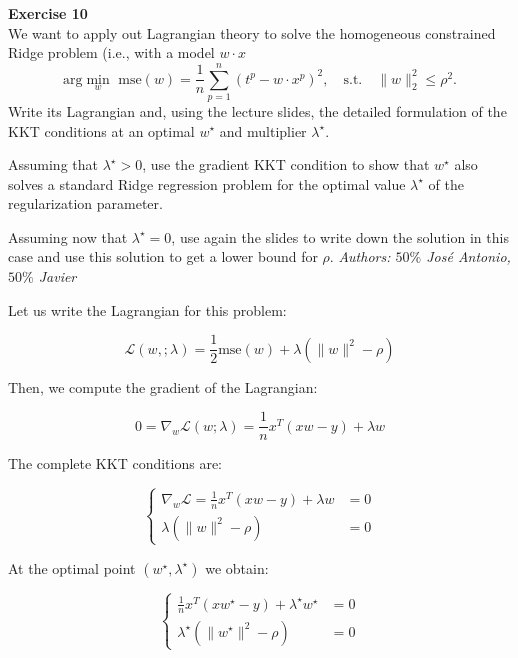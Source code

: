 \documentclass[11pt,table]{article}
\newenvironment{problem}[2][Exercise]
{ \begin{mdframed}[backgroundcolor=gray!20] \textbf{#1 #2} \\}
	{\hspace{0.0cm}\newline\newline \emph{Authors: \(50\%\) José Antonio, \(50\%\) Javier}  \end{mdframed}}
\newcommand\norm[1]{\lVert#1\rVert}
\begin{document}
	
	
	\begin{problem}{10}
		We want to apply out Lagrangian theory to solve the homogeneous constrained Ridge problem (i.e., with a model \(w\cdot x\)
		\[
		\text{arg}\min_{w} \text{ mse}(w) = \frac{1}{n} \sum_{p=1}^n (t^p - w \cdot x^p)^2, \quad \text{s.t.} \quad \norm{w}_2^2 \leq \rho^2.
		\]
		Write its Lagrangian and, using the lecture slides, the detailed formulation of the KKT conditions at an optimal \(w^\star\) and multiplier \(\lambda^\star\).
		
		Assuming that \(\lambda^\star > 0\), use the gradient KKT condition to show that \(w^\star\) also solves a standard Ridge regression problem for the optimal value \(\lambda^\star\) of the regularization parameter.
		
		Assuming now that \(\lambda^\star = 0\), use again the slides to write down the solution in this case and use this solution to get a lower bound for \(\rho\).
	\end{problem}
	
	Let us write the Lagrangian for this problem:
	
	\[
	\mathcal L(w, ; \lambda) = \frac{1}{2} \text{mse}(w) + \lambda \left(\parallel w \parallel^2 - \rho\right)
	\]
	
	Then, we compute the gradient of the Lagrangian:
	
	\[
	0 = \nabla_w \mathcal L(w; \lambda) = \frac{1}{n}x^T(xw - y) + \lambda w
	\]
	
	The complete KKT conditions are:
	
	\begin{equation*}
		\begin{cases}
			\nabla_w \mathcal L = \frac{1}{n}x^T(xw - y) + \lambda w & = 0 \\
			\lambda \left(\parallel w \parallel^2 - \rho\right)      & = 0
		\end{cases}
	\end{equation*}
	
	At the optimal point $(w^\star, \lambda^\star)$ we obtain:
	
	\begin{equation}
		\label{eq10}
		\begin{cases}
			\frac{1}{n}x^T(xw^\star - y) + \lambda^\star w^\star                & = 0 \\
			\lambda^\star \left(\parallel w^\star \parallel^2 - \rho\right) & = 0
		\end{cases}
	\end{equation}
	
\end{document}
